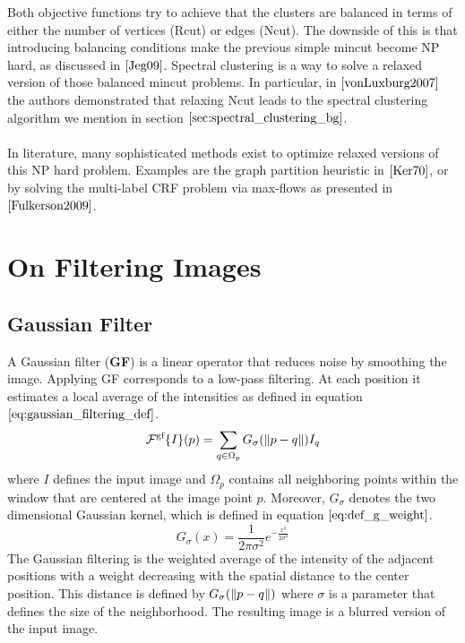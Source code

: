 Both objective functions try to achieve that the clusters are balanced in terms of either the number of vertices (Rcut) or edges (Ncut). The downside of this is that introducing balancing conditions make the previous simple mincut become NP hard, as discussed in $\cite{Jeg09}$. Spectral clustering is a way to solve a relaxed version of those balanced mincut problems. In particular, in $\cite{vonLuxburg2007}$ the authors demonstrated that relaxing Ncut leads to the spectral clustering algorithm we mention in section $\ref{sec:spectral_clustering_bg}$. \\ \\
In literature, many sophisticated methods exist to optimize relaxed versions of this NP hard problem. Examples are the graph partition heuristic in $\cite{Ker70}$, or by solving the multi-label CRF problem via max-flows as presented in $\cite{Fulkerson2009}$.

\section{On Filtering Images}
\subsection{Gaussian Filter}
A Gaussian filter (\textbf{GF}) is a linear operator that reduces noise by smoothing the image. Applying GF corresponds to a low-pass filtering.
At each position it estimates a local average of the intensities as defined in equation $\ref{eq:gaussian_filtering_def}$.
\begin{equation}
	\mathcal{F}^{\text{gf}} \{I \} (p) = \sum_{q \in \Omega_p} G_{\sigma} (\left\lVert p - q\right\rVert) I_q
\label{eq:gaussian_filtering_def}
\end{equation}
where $I$ defines the input image and $\Omega_p$ contains all neighboring points within the window that are centered at the image point $p$. Moreover, $G_{\sigma}$ denotes the two dimensional Gaussian kernel, which is defined in equation $\ref{eq:def_g_weight}$.
\begin{equation}
	G_{\sigma} (x) = \frac{1}{2 \pi \sigma^2} e^{-\frac{x^2}{2 \sigma^2}}
\label{eq:def_g_weight}
\end{equation}
The Gaussian filtering is the weighted average of the intensity of the adjacent positions with a weight decreasing with the spatial distance to the center position. This distance is defined by $G_{\sigma} (\left\lVert p - q\right\rVert)$ where $\sigma$ is a parameter that defines the size of the neighborhood. The resulting image is a blurred version of the input image.

